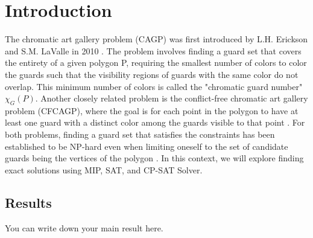 \chapter{Introduction}
The chromatic art gallery problem (CAGP) was first introduced by L.H. Erickson and S.M. LaValle in 2010 \cite{erickson2010chromatic}. The problem involves finding a guard set that covers the entirety of a given polygon P, requiring the smallest number of colors to color the guards such that the visibility regions of guards with the same color do not overlap. This minimum number of colors is called the "chromatic guard number" $\chi_G(P)$. Another closely related problem is the conflict-free chromatic art gallery problem (CFCAGP), where the goal is for each point in the polygon to have at least one guard with a distinct color among the guards visible to that point \cite{bartschi2014conflict}. For both problems, finding a guard set that satisfies the constraints has been established to be NP-hard even when limiting oneself to the set of candidate guards being the vertices of the polygon \cite{fekete2014chromatic}\cite{erickson2011many}\cite{iwamoto2022vertex}. In this context, we will explore finding exact solutions using MIP, SAT, and CP-SAT Solver.

\section{Results}
You can write down your main result here.

